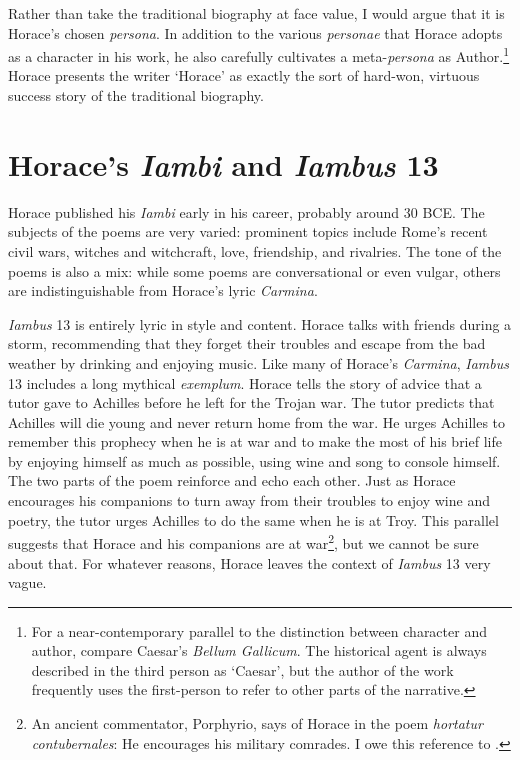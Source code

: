 Rather than take the traditional biography at face value, I would argue that it is Horace's chosen \textit{persona}.  In addition to the various \textit{personae} that Horace adopts as a character in his work, he also carefully cultivates a meta-\textit{persona} as Author.\footnote{For a near-contemporary parallel to the distinction between character and author, compare Caesar's \textit{Bellum Gallicum}.  The historical agent is always described in the third person as `Caesar', but the author of the work frequently uses the first-person to refer to other parts of the narrative.}  Horace presents the writer `Horace' as exactly the sort of hard-won, virtuous success story of the traditional biography.


\section*{Horace's \textit{Iambi} and \textit{Iambus} 13}

Horace published his \textit{Iambi} early in his career, probably around 30 BCE.  The subjects of the poems are very varied: prominent topics include Rome's recent civil wars, witches and witchcraft, love, friendship, and rivalries.  The tone of the poems is also a mix: while some poems are conversational or even vulgar, others are indistinguishable from Horace's lyric \textit{Carmina}.

\textit{Iambus} 13 is entirely lyric in style and content.  Horace talks with friends during a storm, recommending that they forget their troubles and escape from the bad weather by drinking and enjoying music.  Like many of Horace's \textit{Carmina}, \textit{Iambus} 13 includes a long mythical \textit{exemplum}.  Horace tells the story of advice that a tutor gave to Achilles before he left for the Trojan war.  The tutor predicts that Achilles will die young and never return home from the war.  He urges Achilles to remember this prophecy when he is at war and to make the most of his brief life by enjoying himself as much as possible, using wine and song to console himself.  The two parts of the poem reinforce and echo each other.  Just as Horace encourages his companions to turn away from their troubles to enjoy wine and poetry, the tutor urges Achilles to do the same when he is at Troy.  This parallel suggests that Horace and his companions are at war\footnote{An ancient commentator, Porphyrio, says of Horace in the poem \textit{hortatur contubernales}: He encourages his military comrades.  I owe this reference to \citet[137]{kilpatrick1970}.}, but we cannot be sure about that. For whatever reasons, Horace leaves the context of \textit{Iambus} 13 very vague.

